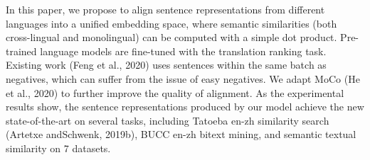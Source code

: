 In this paper, we propose to align sentence representations from different languages into a unified embedding space, where semantic similarities (both cross-lingual and monolingual) can be computed with a simple dot product. Pre-trained language models are fine-tuned with the translation ranking task. Existing work (Feng et al., 2020) uses sentences within the same batch as negatives, which can suffer from the issue of easy negatives. We adapt MoCo (He et al., 2020) to further improve the quality of alignment. As the experimental results show, the sentence representations produced by our model achieve the new state-of-the-art on several tasks, including Tatoeba en-zh similarity search (Artetxe andSchwenk, 2019b), BUCC en-zh bitext mining, and semantic textual similarity on 7 datasets.
